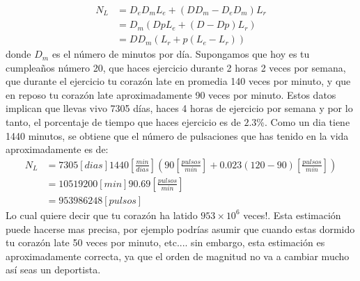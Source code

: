 \begin{example}
\begin{tcolorbox}[colback=green!5!white,colframe=green!75!black,boxrule=0.5pt,arc=4pt,left=6pt,right=6pt,top=6pt,bottom=6pt,boxsep=0pt]
\begin{align}
N_L & = D_e D_m L_e + ( D D_m - D_e D_m ) L_r\\
    & = D_m (Dp L_e + (D - Dp)L_r)\\
    & = D D_m ( L_r + p (L_e - L_r ) )
\end{align}
donde $D_m$ es el n\'umero de minutos por d\'ia. Supongamos que hoy es tu cumplea\~nos n\'umero 20, que haces ejercicio durante 2 horas 2 veces por semana, que durante el ejercicio tu coraz\'on late en promedia 140 veces por minuto, y que en reposo tu coraz\'on late aproximadamente 90 veces por minuto. Estos datos implican que llevas vivo 7305 d\'ias, haces 4 horas de ejercicio por semana y por lo tanto, el porcentaje de tiempo que haces ejercicio es de $2.3 \%$. Como un dia tiene 1440 minutos, se obtiene que el n\'umero de pulsaciones que has tenido en la vida aproximadamente es de:
\begin{align*}
N_L & = 7305 [dias] 1440 [\frac{min}{dias}] ( 90 [\frac{pulsos}{min}] + 0.023 (120 - 90)[\frac{pulsos}{min}] ) \\
    & = 10519200 [min] 90.69 [\frac{pulsos}{min}]  \\
    & = 953986248 [pulsos] 
\end{align*} 
Lo cual quiere decir que tu coraz\'on ha latido $953\times 10^6$ veces!. Esta estimaci\'on puede hacerse mas precisa, por ejemplo podr\'ias asumir que cuando estas dormido tu coraz\'on late 50 veces por minuto, etc.... sin embargo, esta estimaci\'on es aproximadamente correcta, ya que el orden de magnitud no va a cambiar mucho as\'i seas un deportista.
\end{tcolorbox}
\end{example}
